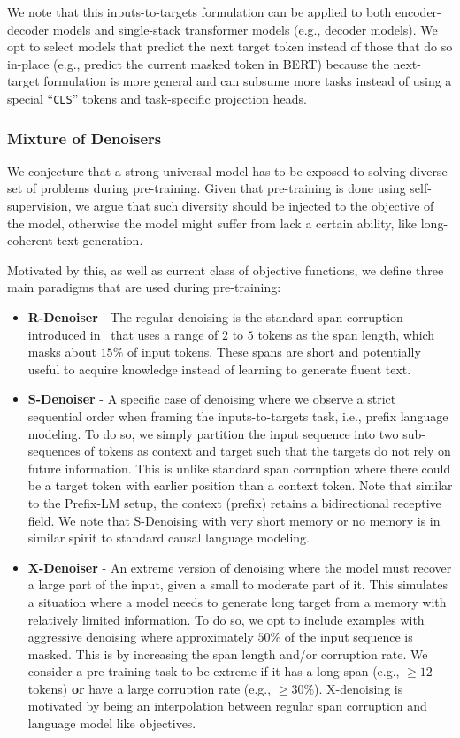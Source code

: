 \documentclass[10pt]{article}
\begin{document}
We note that this inputs-to-targets formulation can be applied to both encoder-decoder models and single-stack transformer models (e.g., decoder models). We opt to select models that predict the next target token instead of those that do so in-place (e.g., predict the current masked token in BERT) because the next-target formulation is more general and can subsume more tasks instead of using a special ``\texttt{CLS}'' tokens and task-specific projection heads.


\subsubsection{Mixture of Denoisers}
We conjecture that a strong universal model has to be exposed to solving diverse set of problems during pre-training. Given that pre-training is done using self-supervision, we argue that such diversity should be injected to the objective of the model, otherwise the model might suffer from lack a certain ability, like long-coherent text generation.  

Motivated by this, as well as current class of objective functions, we define three main paradigms that are used during pre-training:
\begin{itemize}
    \item \textbf{R-Denoiser} - The regular denoising is the standard span corruption introduced in~\citet{raffel2019exploring} that uses a range of $2$ to $5$ tokens as the span length, which masks about $15\%$ of input tokens. These spans are short and potentially useful to acquire knowledge instead of learning to generate fluent text. 
    \item \textbf{S-Denoiser} - A specific case of denoising where we observe a strict sequential order when framing the inputs-to-targets task, i.e., prefix language modeling. To do so, we simply partition the input sequence into two sub-sequences of tokens as context and target such that the targets do not rely on future information. This is unlike standard span corruption where there could be a target token with earlier position than a context token. Note that similar to the Prefix-LM setup, the context (prefix) retains a bidirectional receptive field. We note that S-Denoising with very short memory or no memory is in similar spirit to standard causal language modeling. 
    \item \textbf{X-Denoiser}  - An extreme version of denoising where the model must recover a large part of the input, given a small to moderate part of it. This simulates a situation where a model needs to generate long target from a memory with relatively limited information. To do so, we opt to include examples with aggressive denoising where approximately $50\%$ of the input sequence is masked. This is by increasing the span length and/or corruption rate. We consider a pre-training task to be extreme if it has a long span (e.g., $\geq12$ tokens) \textbf{or} have a large corruption rate (e.g., $\geq30\%$). X-denoising is motivated by being an interpolation between regular span corruption and language model like objectives. 
\end{itemize}
\end{document}
